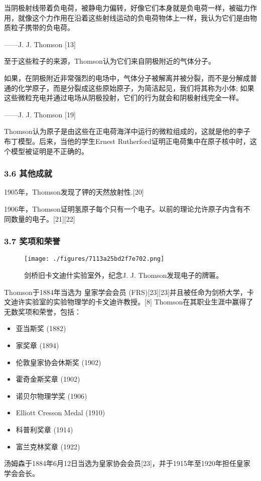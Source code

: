 当阴极射线带着负电荷，被静电力偏转，好像它们本身就是负电荷一样，被磁力作用，就像这个力作用在沿着这些射线运动的负电荷物体上一样，我认为它们是由物质粒子携带的负电荷。

——J. J. Thomson [13]

至于这些粒子的来源，Thomson认为它们来自阴极附近的气体分子。

如果，在阴极附近非常强烈的电场中，气体分子被解离并被分裂，而不是分解成普通的化学原子，而是分裂成这些原始原子，为简洁起见，我们将其称为小体; 如果这些微粒充电并通过电场从阴极投射，它们的行为就会和阴极射线完全一样。

——J. J. Thomson [19]

Thomson认为原子是由这些在正电荷海洋中运行的微粒组成的，这就是他的李子布丁模型。后来，当他的学生Ernest Rutherford证明正电荷集中在原子核中时，这个模型被证明是不正确的。

\subsubsection{3.6 其他成就}
1905年，Thomson发现了钾的天然放射性.[20]

1906年，Thomson证明氢原子每个只有一个电子。以前的理论允许原子内含有不同数量的电子。[21][22]

\subsubsection{3.7 奖项和荣誉}
\begin{figure}[ht]
\centering
\texttt{[image: ./figures/7113a25bd2f7e702.png]}
\caption{剑桥旧卡文迪什实验室外，纪念J. J. Thomson发现电子的牌匾。} \label{fig_Joseph_7}
\end{figure}
Thomson于1884年当选为 皇家学会会员 (FRS)[23][23]并且被任命为剑桥大学，卡文迪许实验室的实验物理学的卡文迪许教授。[8] Thomson在其职业生涯中赢得了无数奖项和荣誉，包括：
\begin{itemize}
\item 亚当斯奖 (1882)
\item 家奖章 (1894)
\item 伦敦皇家协会休斯奖 (1902)
\item 霍奇金斯奖章 (1902)
\item 诺贝尔物理学奖 (1906)
\item Elliott Cresson Medal (1910)
\item 科普利奖章 (1914)
\item 富兰克林奖章 (1922)
\end{itemize}
汤姆森于1884年6月12日当选为皇家协会会员[23]，并于1915年至1920年担任皇家学会会长。

